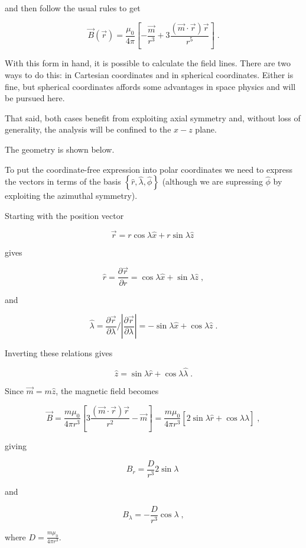 \documentclass[12pt]{article}
\begin{document}
and then follow the usual rules to get

\[ \vec B(\vec r) = \frac{\mu_0}{4 \pi} \left[ -\frac{\vec m}{r^3} + 3 \frac{(\vec m \cdot \vec r) \vec r}{r^5} \right] \; .\]

With this form in hand, it is possible to calculate the field lines.  There are two ways to do this: in Cartesian coordinates and in spherical coordinates.  Either is fine, but spherical coordinates affords some advantages in space physics and will be pursued here.

That said, both cases benefit from exploiting axial symmetry and, without loss of generality, the analysis will be confined to the $x-z$ plane.

The geometry is shown below.


To put the coordinate-free expression into polar coordinates we need to express the vectors in terms of the basis $\left\{ \hat r, \hat \lambda, \hat \phi \right\}$ (although we are supressing $\hat \phi$ by exploiting the azimuthal symmetry).

Starting with the position vector 

\[ \vec r  = r \cos \lambda \hat x + r \sin \lambda \hat z \; \]

gives

\[ \hat r = \frac{\partial \vec r}{\partial r} = \cos \lambda \hat x + \sin \lambda \hat z \; , \]

and

\[ \hat \lambda =   \frac{\partial \vec r}{\partial \lambda} / \left| \frac{\partial \vec r}{\partial \lambda} \right| =  - \sin \lambda \hat x + \cos \lambda \hat z \; . \]

Inverting these relations gives

\[ \hat z = \sin \lambda \hat r + \cos \lambda \hat \lambda \; .\]

Since $\vec m = m \hat z$, the magnetic field becomes

\[ \vec B = \frac{m \mu_0}{4 \pi r^3} \left[ 3 \frac{ (\vec m \cdot \vec r) \vec r }{r^2} - \vec m \right] = \frac{m \mu_0}{4 \pi r^3} \left[ 2 \sin \lambda \hat r + \cos \lambda \hat \lambda \right] \; , \]

giving

\[ B_r = \frac{D}{r^3} 2 \sin \lambda \; \]

and

\[ B_{\lambda} = - \frac{D}{r^3} \cos \lambda \; , \]

where $D = \frac{m \mu_0}{4 \pi r^3}$.
\end{document}

